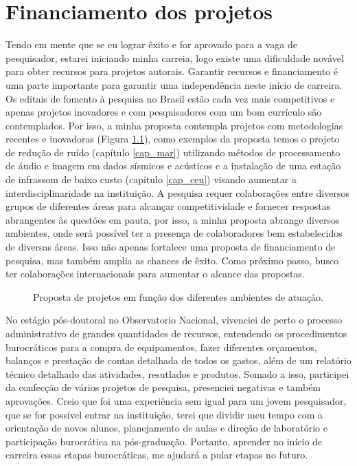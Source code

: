 \documentclass[10pt,a4paper,oneside]{book}
\begin{document}

\chapter{Financiamento dos projetos}
\label{cap_financiamento}

Tendo em mente que se eu lograr êxito e for aprovado para a vaga de pesquisador, estarei iniciando minha carreia, logo existe uma dificuldade novável para obter recursos para projetos autorais. Garantir recursos e financiamento é uma parte importante para garantir uma independência neste início de carreira. Os editais de fomento à pesquisa no Brasil estão cada vez mais competitivos e apenas projetos inovadores e com pesquisadores com um bom currículo são contemplados. Por isso, a minha proposta contempla projetos com metodologias recentes e inovadoras (Figura \ref{fig_resumo_projetos}), como exemplos da proposta temos o projeto de redução de ruído (capítulo \ref{cap_mar}) utilizando métodos de processamento de áudio e imagem em dados sísmicos e acústicos e a instalação de uma estação de infrassom de baixo custo (capítulo \ref{cap_ceu}) visando aumentar a interdisciplinaridade na instituição. A pesquisa requer colaborações entre diversos grupos de diferentes áreas para alcançar competitividade e fornecer respostas abrangentes às questões em pauta, por isso, a minha proposta abrange diversos ambientes, onde será possível ter a presença de colaboradores bem estabelecidos de diversas áreas. Isso não apenas fortalece uma proposta de financiamento de pesquisa, mas também amplia as chances de êxito. Como próximo passo, busco ter colaborações internacionais para aumentar o alcance das propostas.

\begin{figure}[ht]
	\centering
	\bigskip
	\caption{Proposta de projetos em função dos diferentes ambientes de atuação.}
	\label{fig_resumo_projetos}
\end{figure}

No estágio pós-doutoral no Observatorio Nacional, vivenciei de perto o processo administrativo de grandes quantidades de recursos, entendendo os procedimentos burocráticos para a compra de equipamentos, fazer diferentes orçamentos, balanços e prestação de contas detalhada de todos os gastos, além de um relatório técnico detalhado das atividades, resutlados e produtos. Somado a isso, participei da confecção de vários projetos de pesquisa, presenciei negativas e também aprovações. Creio que foi uma experiência sem igual para um jovem pesquisador, que se for possível entrar na instituição, terei que dividir meu tempo com a orientação de novos alunos, planejamento de aulas e direção de laboratório e participação burocrática na pós-graduação. Portanto, aprender no início de carreira essas etapas burocráticas, me ajudará a pular etapas no futuro.
\end{document}
